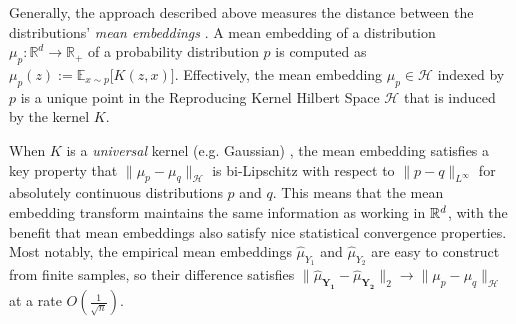Generally, the approach described above measures the distance between the distributions' \emph{mean embeddings} \cite{muandet2017kernel}.  A mean embedding of a distribution $\mu_p:\mathbb{R}^d\rightarrow \mathbb{R}_+$ of a probability distribution $p$ is computed as
$   \mu_p(z) := \mathbb{E}_{x\sim p} \big[K(z,x)\big].$
Effectively, the mean embedding $\mu_p\in\mathcal{H}$ indexed by $p$ is a unique point in the Reproducing Kernel Hilbert Space $\mathcal{H}$ that is induced by the kernel $K$.



When $K$ is a \emph{universal} kernel (e.g. Gaussian) \cite{micchelli2006universal}, the mean embedding satisfies a key property that $\|\mu_p - \mu_q\|_\mathcal{H}$ %
is bi-Lipschitz with respect to $\|p - q\|_{L^{\infty}}$ for absolutely continuous distributions $p$ and $q$.  This means that the mean embedding transform maintains the same information as working in $\mathbb{R}^d$, with the benefit that mean embeddings also satisfy nice statistical convergence properties.  Most notably,
the empirical mean embeddings $\widehat{\mu}_{Y_1}$ and $\widehat{\mu}_{Y_2}$ are easy to construct from finite samples, so %
their difference satisfies
$\|\widehat{\mu}_\mathbf{Y_1} - \widehat{\mu}_\mathbf{Y_2}\|_2 \rightarrow \|\mu_p - \mu_q\|_\mathcal{H}$ at a rate $O\left(\frac{1}{\sqrt{n}}\right)$.  


